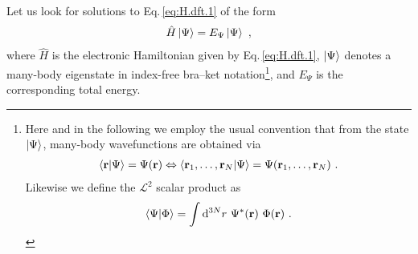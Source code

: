 \documentclass[a4paper,12pt]{book}
\renewcommand{\d}{{\rm d}}
\begin{document}
Let us look for solutions to Eq.\,\eqref{eq:H.dft.1} of the form
\begin{align}
	\hat H \Ket{\Psi} = E_\Psi \Ket{\Psi}~,
	\label{eq:SE.dft.1}
\end{align}
where $\hat H$ is the electronic Hamiltonian given by Eq.\,\eqref{eq:H.dft.1}, $\Ket{\Psi}$ denotes a many-body eigenstate in index-free bra--ket notation\footnote{
	Here and in the following we employ the usual convention that from the state $\Ket{\Psi}$, many-body wavefunctions are obtained via
	\begin{align*}
		\braket{{\bf r} | \Psi} 
			= \Psi ({\bf r})
		\Leftrightarrow
		\braket{{\bf r}_1, \ldots, {\bf r}_N | \Psi} 
			= \Psi({\bf r}_1, \ldots, {\bf r}_N)~.
	\end{align*}
	Likewise we define the $\mathcal{L}^2$ scalar product as
	$$
	\braket{\Psi | \Phi} = \int \d^{3N} r ~ \Psi^\ast ({\bf r}) \ \Phi({\bf r})~.
	$$	
},
and $E_\Psi$ is the corresponding total energy.
\end{document}

